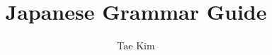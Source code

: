 \documentclass[8pt]{report}
\title{Japanese Grammar Guide}
\author{Tae Kim}
\begin{document}
\tkbegin


\end{document}
